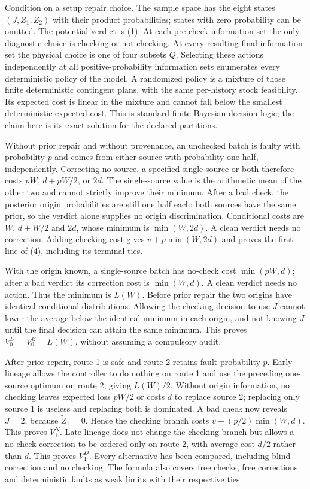 \documentclass[
  11pt,
  a4paper,
]{article}
\begin{document}
Condition on a setup repair choice. The sample space has the eight
states \((J,Z_1,Z_2)\) with their product probabilities; states with
zero probability can be omitted. The potential verdict is (1). At each
pre-check information set the only diagnostic choice is checking or not
checking. At every resulting final information set the physical choice
is one of four subsets \(Q\). Selecting these actions independently at
all positive-probability information sets enumerates every deterministic
policy of the model. A randomized policy is a mixture of those finite
deterministic contingent plans, with the same per-history stock
feasibility. Its expected cost is linear in the mixture and cannot fall
below the smallest deterministic expected cost. This is standard finite
Bayesian decision logic; the claim here is its exact solution for the
declared partitions.

Without prior repair and without provenance, an unchecked batch is
faulty with probability \(p\) and comes from either source with
probability one half, independently. Correcting no source, a specified
single source or both therefore costs \(pW\), \(d+pW/2\), or \(2d\). The
single-source value is the arithmetic mean of the other two and cannot
strictly improve their minimum. After a bad check, the posterior origin
probabilities are still one half each: both sources have the same prior,
so the verdict alone supplies no origin discrimination. Conditional
costs are \(W\), \(d+W/2\) and \(2d\), whose minimum is \(\min(W,2d)\).
A clean verdict needs no correction. Adding checking cost gives
\(v+p\min(W,2d)\) and proves the first line of (4), including its
terminal ties.

With the origin known, a single-source batch has no-check cost
\(\min(pW,d)\); after a bad verdict its correction cost is
\(\min(W,d)\). A clean verdict needs no action. Thus the minimum is
\(L(W)\). Before prior repair the two origins have identical conditional
distributions. Allowing the checking decision to use \(J\) cannot lower
the average below the identical minimum in each origin, and not knowing
\(J\) until the final decision can attain the same minimum. This proves
\(V_0^D=V_0^E=L(W)\), without assuming a compulsory audit.

After prior repair, route 1 is safe and route 2 retains fault
probability \(p\). Early lineage allows the controller to do nothing on
route 1 and use the preceding one-source optimum on route 2, giving
\(L(W)/2\). Without origin information, no checking leaves expected loss
\(pW/2\) or costs \(d\) to replace source 2; replacing only source 1 is
useless and replacing both is dominated. A bad check now reveals
\(J=2\), because \(\widetilde Z_1=0\). Hence the checking branch costs
\(v+(p/2)\min(W,d)\). This proves \(V_1^N\). Late lineage does not
change the checking branch but allows a no-check correction to be
ordered only on route 2, with average cost \(d/2\) rather than \(d\).
This proves \(V_1^D\). Every alternative has been compared, including
blind correction and no checking. The formula also covers free checks,
free corrections and deterministic faults as weak limits with their
respective ties.
\end{document}
